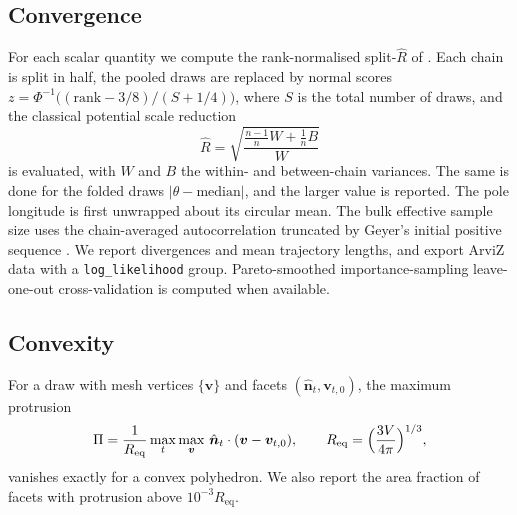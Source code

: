 \documentclass[11pt,a4paper]{article}
\theoremstyle{remark}
\newcommand{\vect}[1]{\bm{#1}}
\newcommand{\uv}[1]{\hat{\bm{#1}}}
\newcommand{\Req}{R_{\mathrm{eq}}}
\begin{document}
\subsection{Convergence}
For each scalar quantity we compute the rank-normalised split-$\widehat R$ of \citet{vehtari2021}. Each
chain is split in half, the pooled draws are replaced by normal scores $z=\Phi^{-1}\bigl((\mathrm{rank}-3/8)/(S+1/4)\bigr)$,
where $S$ is the total number of draws, and the classical potential scale reduction
\begin{equation}
  \widehat R=\sqrt{\frac{\frac{n-1}{n}W+\frac1nB}{W}}
\end{equation}
is evaluated, with $W$ and $B$ the within- and between-chain variances. The same is done for the
folded draws $|\theta-\mathrm{median}|$, and the larger value is reported. The pole longitude is first
unwrapped about its circular mean. The bulk effective sample size uses the chain-averaged
autocorrelation truncated by Geyer's initial positive sequence \citep{geyer1992}. We report divergences
and mean trajectory lengths, and export ArviZ data \citep{kumar2019} with a \texttt{log\_likelihood}
group. Pareto-smoothed importance-sampling leave-one-out cross-validation
\citep{vehtari2017,vehtari2024} is computed when available.

\subsection{Convexity}
For a draw with mesh vertices $\{\vect v\}$ and facets $(\uv n_t,\vect v_{t,0})$, the maximum protrusion
\begin{equation}
  \Pi=\frac{1}{\Req}\max_t\max_{\vect v}\,\uv n_t\cdot(\vect v-\vect v_{t,0}),\qquad \Req=\Bigl(\frac{3V}{4\pi}\Bigr)^{1/3},
\end{equation}
vanishes exactly for a convex polyhedron. We also report the area fraction of facets with protrusion
above $10^{-3}\Req$.
\end{document}

